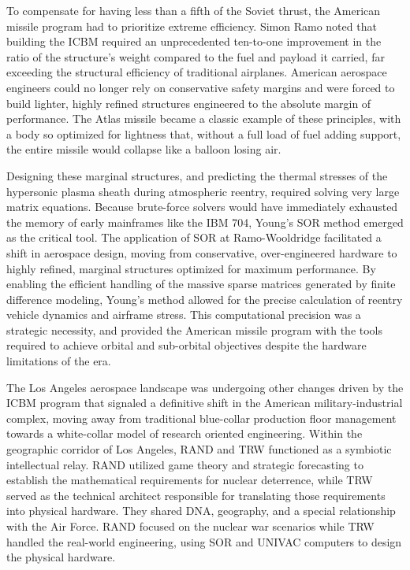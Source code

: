 To compensate for having less than a fifth of the Soviet thrust, the American missile program had to prioritize extreme efficiency. Simon Ramo noted that building the ICBM required an unprecedented ten-to-one improvement in the ratio of the structure's weight compared to the fuel and payload it carried, far exceeding the structural efficiency of traditional airplanes. American aerospace engineers could no longer rely on conservative safety margins and were forced to build lighter, highly refined structures engineered to the absolute margin of performance. The Atlas missile became a classic example of these principles, with a body so optimized for lightness that, without a full load of fuel adding support, the entire missile would collapse like a balloon losing air. 

Designing these marginal structures, and predicting the thermal stresses of the hypersonic plasma sheath during atmospheric reentry, required solving very large matrix equations. Because brute-force solvers would have immediately exhausted the memory of early mainframes like the IBM 704, Young's SOR method emerged as the critical tool. The application of SOR at Ramo-Wooldridge facilitated a shift in aerospace design, moving from conservative, over-engineered hardware to highly refined, marginal structures optimized for maximum performance. By enabling the efficient handling of the massive sparse matrices generated by finite difference modeling, Young’s method allowed for the precise calculation of reentry vehicle dynamics and airframe stress. This computational precision was a strategic necessity, and provided the American missile program with the tools required to achieve orbital and sub-orbital objectives despite the hardware limitations of the era. 

The Los Angeles aerospace landscape was undergoing other changes driven by the ICBM program that signaled a definitive shift in the American military-industrial complex, moving away from traditional blue-collar production floor management towards a white-collar model of research oriented engineering. Within the geographic corridor of Los Angeles, RAND and TRW functioned as a symbiotic intellectual relay. RAND utilized game theory and strategic forecasting to establish the mathematical requirements for nuclear deterrence, while TRW served as the technical architect responsible for translating those requirements into physical hardware. They shared DNA, geography, and a special relationship with the Air Force. RAND focused on the nuclear war scenarios while TRW handled the real-world engineering, using SOR and UNIVAC computers to design the physical hardware.

